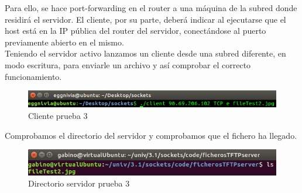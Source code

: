 \documentclass[journal, a4paper]{IEEEtran}
\begin{document}
Para ello, se hace port-forwarding en el router a una máquina de la subred donde residirá el servidor. El cliente, por su parte, deberá indicar al ejecutarse que el host está en la IP pública del router del servidor, conectándose al puerto previamente abierto en el mismo.\\

Teniendo el servidor activo lanzamos un cliente desde una subred diferente, en modo escritura, para enviarle un archivo y así comprobar el correcto funcionamiento.

\begin{figure}[H]
\centering
\includegraphics[scale=0.45]{images/client_after_3}
\caption{Cliente prueba 3}
\end{figure}

Comprobamos el directorio del servidor y comprobamos que el fichero ha llegado.

\begin{figure}[H]
\centering
\includegraphics[scale=0.55]{images/im1}
\caption{Directorio servidor prueba 3}
\end{figure}

\end{document}
